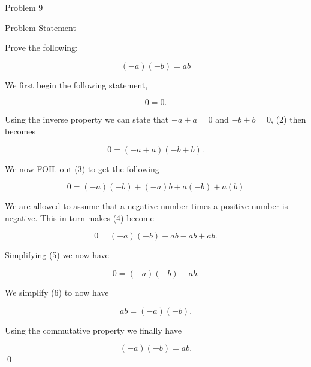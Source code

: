 \begin{problem}{Problem 9}
    \begin{statement}{Problem Statement}

        Prove the following:

        \setcounter{equation}{0}
        \begin{equation}
            (-a)(-b) = ab
        \end{equation}

    \end{statement}

    \begin{highlight}[Solution]
        We first begin the following statement,

        \begin{equation}
            0 = 0.
        \end{equation}

        Using the inverse property we can state that $-a + a = 0$ and $-b + b = 0$, (2) then becomes

        \begin{equation}
            0 = (-a + a)(-b + b).
        \end{equation}

        We now FOIL out (3) to get the following

        \begin{equation}
            0 = (-a)(-b) + (-a)b + a(-b) + a(b)
        \end{equation}

        We are allowed to assume that a negative number times a positive number is negative. This in turn makes (4) become

        \begin{equation}
            0 = (-a)(-b) - ab - ab + ab.
        \end{equation}

        Simplifying (5) we now have

        \begin{equation}
            0 = (-a)(-b) - ab.
        \end{equation}

        We simplify (6) to now have

        \begin{equation}
            ab = (-a)(-b).
        \end{equation}

        Using the commutative property we finally have

        \begin{equation}
            (-a)(-b) = ab.
        \end{equation}
        \qed
    \end{highlight}
\end{problem}


